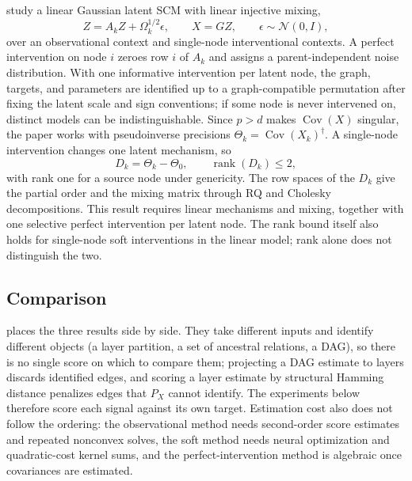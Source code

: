 \documentclass{article}
\newcommand{\Cov}{\operatorname{Cov}}
\newcommand{\rank}{\operatorname{rank}}
\begin{document}
\citet{squires2023linear} study a linear Gaussian latent SCM with linear injective mixing,
\begin{equation}
    Z=A_kZ+\Omega_k^{1/2}\epsilon,
    \qquad X=GZ,
    \qquad \epsilon\sim\mathcal N(0,I),
    \label{eq:perfect-model}
\end{equation}
over an observational context and single-node interventional contexts. A perfect intervention on node $i$ zeroes row $i$ of $A_k$ and assigns a parent-independent noise distribution. With one informative intervention per latent node, the graph, targets, and parameters are identified up to a graph-compatible permutation after fixing the latent scale and sign conventions; if some node is never intervened on, distinct models can be indistinguishable. Since $p>d$ makes $\Cov(X)$ singular, the paper works with pseudoinverse precisions $\Theta_k=\Cov(X_k)^\dagger$. A single-node intervention changes one latent mechanism, so
\begin{equation}
    D_k=\Theta_k-\Theta_0,
    \qquad \rank(D_k)\leq 2,
    \label{eq:rank-two}
\end{equation}
with rank one for a source node under genericity. The row spaces of the $D_k$ give the partial order and the mixing matrix through RQ and Cholesky decompositions. This result requires linear mechanisms and mixing, together with one selective perfect intervention per latent node. The rank bound itself also holds for single-node soft interventions in the linear model; rank alone does not distinguish the two.

\subsection{Comparison}

 places the three results side by side. They take different inputs and identify different objects (a layer partition, a set of ancestral relations, a DAG), so there is no single score on which to compare them; projecting a DAG estimate to layers discards identified edges, and scoring a layer estimate by structural Hamming distance penalizes edges that $P_X$ cannot identify. The experiments below therefore score each signal against its own target. Estimation cost also does not follow the ordering: the observational method needs second-order score estimates and repeated nonconvex solves, the soft method needs neural optimization and quadratic-cost kernel sums, and the perfect-intervention method is algebraic once covariances are estimated.
\end{document}
